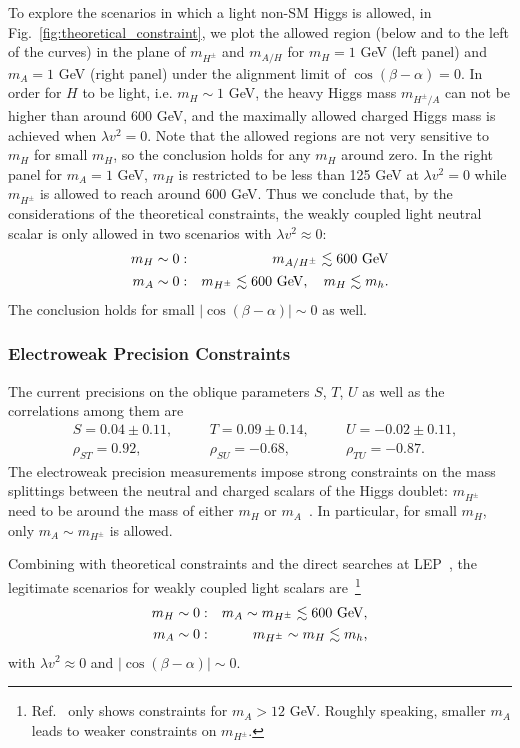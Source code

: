 \documentclass[letterpaper,11pt]{article}
\newcommand{\be}{\begin{equation}\begin{aligned}}
\newcommand{\ee}{\end{aligned}\end{equation}}
\def\cosba{\cos(\beta-\alpha)}
\begin{document}
To explore the scenarios in which a light non-SM Higgs is allowed, in Fig.~\ref{fig:theoretical_constraint}, we plot the allowed region (below and to the left of the curves) in the plane of $m_{H^\pm}$ and $m_{A/H}$ for $m_H=1$ GeV (left panel) and $m_A=1$ GeV (right panel) under the alignment limit of $\cos(\beta-\alpha)=0$.  In order for $H$ to be light, i.e. $m_{H}\sim 1$ GeV, the heavy Higgs mass $m_{H^\pm/A}$ can not be higher than around 600 GeV, and the maximally allowed charged Higgs mass is achieved when $\lambda v^2=0$. Note that the allowed regions are not very sensitive to $m_H$ for small $m_H$, so the conclusion holds for any $m_H$ around zero. In the right panel for $m_A=1$ GeV,  $m_H$ is restricted to be less than 125 GeV at $\lambda v^2=0$ while $m_{H^\pm}$ is allowed to reach around 600 GeV.  Thus we conclude that, by the considerations of the theoretical constraints, the weakly coupled light neutral scalar is only allowed in two scenarios with $\lambda v^2\approx 0$:
\begin{eqnarray}
m_H\sim 0: && m_{A/H^\pm}\lesssim 600\ {\rm GeV}  \\
m_A\sim 0: && m_{H^\pm}\lesssim 600\ {\rm GeV},  \quad m_H\lesssim m_h.
\end{eqnarray}
The conclusion holds for small $|\cosba|\sim 0$ as well.
 


\subsubsection{Electroweak Precision Constraints}

 The current precisions on  the oblique parameters $S$, $T$, $U$ as well as the correlations among them are \cite{Haller:2018nnx}
%
\be
&S=0.04 \pm 0.11,\quad && T=0.09\pm 0.14,\quad &&U=-0.02 \pm 0.11, \\
&\rho_{ST}=0.92, && \rho_{SU}=-0.68,&& \rho_{TU}=-0.87.
\ee
The electroweak precision measurements impose strong constraints on the mass splittings between the neutral and charged scalars of the Higgs doublet:  $m_{H^\pm}$ need to be around the mass of either $m_H$ or $m_A$~\cite{Gu:2017ckc,Chen:2018shg,Cheng:1989ib}. 
In particular, for small $m_H$, only $m_A \sim m_{H^\pm}$ is allowed. 

Combining with theoretical constraints and the direct searches at LEP~\cite{ALEPH:2013htx},  the legitimate scenarios for weakly coupled light scalars are~\footnote{Ref.~\cite{ALEPH:2013htx} only shows constraints for $m_A>12$ GeV. Roughly speaking, smaller $m_A$ leads to weaker constraints on $m_{H^\pm}$. }
\begin{eqnarray}
m_H\sim 0: && m_{A}\sim m_{H^\pm}\lesssim 600\ {\rm GeV},
\label{eq:light_mH}
\\
m_A\sim 0: &&   m_{H^\pm}\sim m_H\lesssim m_h,
\label{eq:light_mA}
\end{eqnarray}
with $\lambda v^2\approx 0$ and $|\cosba|\sim 0$.   
 
\end{document}
